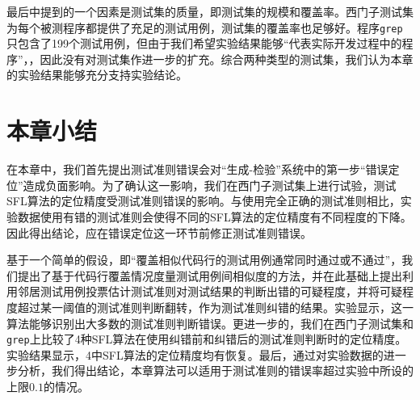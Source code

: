 最后\cite{Steimann:2013:TVV:2483760.2483767}中提到的一个因素是测试集的质量，即测试集的规模和覆盖率。西门子测试集为每个被测程序都提供了充足的测试用例，测试集的覆盖率也足够好。程序\texttt{grep}只包含了199个测试用例，但由于我们希望实验结果能够“代表实际开发过程中的程序”，\cite{doESE05}，因此没有对测试集作进一步的扩充。综合两种类型的测试集，我们认为本章的实验结果能够充分支持实验结论。


\section{本章小结}

在本章中，我们首先提出测试准则错误会对“生成-检验”系统中的第一步“错误定位”造成负面影响。为了确认这一影响，我们在西门子测试集上进行试验，测试SFL算法的定位精度受测试准则错误的影响。与使用完全正确的测试准则相比，实验数据使用有错的测试准则会使得不同的SFL算法的定位精度有不同程度的下降。因此得出结论，应在错误定位这一环节前修正测试准则错误。

基于一个简单的假设，即“覆盖相似代码行的测试用例通常同时通过或不通过”，我们提出了基于代码行覆盖情况度量测试用例间相似度的方法，并在此基础上提出利用邻居测试用例投票估计测试准则对测试结果的判断出错的可疑程度，并将可疑程度超过某一阈值的测试准则判断翻转，作为测试准则纠错的结果。实验显示，这一算法能够识别出大多数的测试准则判断错误。更进一步的，我们在西门子测试集和\texttt{grep}上比较了4种SFL算法在使用纠错前和纠错后的测试准则判断时的定位精度。实验结果显示，4中SFL算法的定位精度均有恢复。最后，通过对实验数据的进一步分析，我们得出结论，本章算法可以适用于测试准则的错误率超过实验中所设的上限$0.1$的情况。